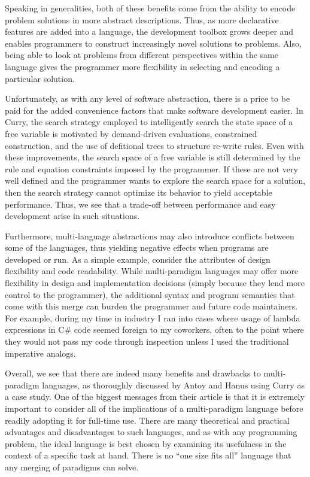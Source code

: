 \documentclass[12pt,letterpaper]{article}
\begin{document}
Speaking in generalities, both of these benefits come from the ability to encode problem solutions in more abstract
descriptions. Thus, as more declarative features are added into a language, the development toolbox
grows deeper and enables programmers to construct increasingly novel solutions to problems. Also, being able 
to look at problems from different perspectives within the same language gives the programmer more 
flexibility in selecting and encoding a particular solution. 

Unfortunately, as with any level of software abstraction, there is a price to be paid for the added 
convenience factors that make software development easier. In Curry, the search strategy employed 
to intelligently search the state space of a free variable is motivated by demand-driven evaluations, 
constrained construction, and the use of defitional trees to structure re-write rules. Even with
these improvements, the search space of a free variable is still determined by the rule and equation
constraints imposed by the programmer. If these are not very well defined and the programmer wants to 
explore the search space for a solution, then the search strategy cannot optimize its behavior to yield
acceptable performance. Thus, we see that a trade-off between performance and easy development arise
in such situations.

Furthermore, multi-language abstractions may also introduce conflicts between some of the languages, thus
yielding negative effects when programs are developed or run. As a simple example, consider the attributes of design 
flexibility and code readability. While multi-paradigm languages may offer more flexibility in design
and implementation decisions (simply because they lend more control to the programmer), the additional
syntax and program semantics that come with this merge can burden the 
programmer and future code maintainers. For example, during my time in industry I ran into cases where 
usage of lambda expressions in C\# code seemed foreign to my coworkers, often to the point where they 
would not pass my code through inspection unless I used the traditional imperative analogs. 

Overall, we see that there are indeed many benefits and drawbacks to multi-paradigm languages, as thoroughly
discussed by Antoy and Hanus using Curry as a case study. One of the biggest messages from their article is that it is extremely important to consider all of the implications of a 
multi-paradigm language before readily adopting it for full-time use. There are many theoretical and 
practical advantages and disadvantages to such languages, and as with any programming problem, 
the ideal language is best chosen by examining its usefulness in the context of a specific task at 
hand. There is no ``one size fits all'' language that any merging of paradigms can solve.



\end{document}
